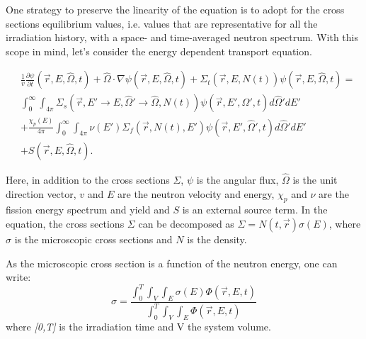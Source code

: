 \documentclass[a4paper,titlepage]{article}
\newcommand{\rvec}{\ensuremath{\vec{r}}}
\newcommand{\omvec}{\ensuremath{\hat{\Omega}}}
\begin{document}
One strategy to preserve the linearity of the equation is to adopt for the cross sections equilibrium values, i.e. values that are representative for all the irradiation history, with a space- and time-averaged neutron spectrum. With this scope in mind, let's consider the energy dependent transport equation.

\begin{centering}
\begin{equation}
    \begin{split}
&\frac{1}{v}\frac{\partial \psi}{\partial t}(\rvec,E,\omvec,t) + {\omvec\cdot  \nabla \psi(\rvec,E,\omvec,t)} + {\Sigma_t(\rvec,E,N(t))\psi(\rvec,E,\omvec,t) } = \\& {\int_0^{\infty}\int_{4\pi} \Sigma_s(\rvec, E'\rightarrow E,\omvec'\rightarrow\omvec,N(t)) \psi(\rvec,E',\omvec',t)d\omvec'dE'} \\&+ {\frac{\chi_p(E)}{4\pi}\int_0^{\infty} \int_{4\pi}\nu(E')\Sigma_f(\rvec,N(t),E') \psi(\rvec,E',\omvec',t)d\omvec'dE'}
\\&+ {S(\rvec, E, \omvec,t)}.
\end{split}
\end{equation}
\end{centering}
Here, in addition to the cross sections $\Sigma$, $\psi$ is the angular flux, $\omvec$ is the unit direction vector, $v$ and $E$ are the neutron velocity and energy, $\chi_p$ and $\nu$ are the fission energy spectrum and yield and $S$ is an external source term. In the equation, the cross sections $\Sigma$ can be decomposed as $\Sigma=N(t,\rvec)\sigma(E)$, where $\sigma$ is the microscopic cross sections and $N$ is the density. 

As the microscopic cross section is a function of the neutron energy, one can write:
\begin{equation}
    \sigma=\frac{\int_0^T \int_V \int_E \sigma(E)\Phi(\rvec,E,t)}{\int_0^T \int_V \int_E \Phi(\rvec,E,t)}
\end{equation}
where \textit{[0,T]} is the irradiation time and V the system volume.
\end{document}
